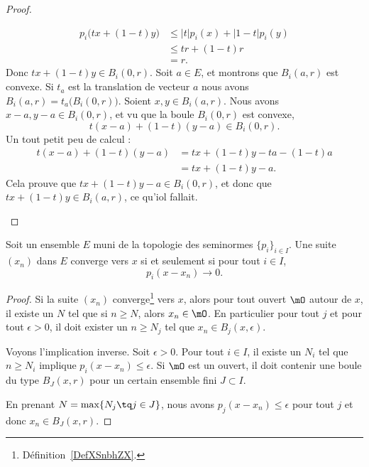 \begin{proof}
\begin{subproof}
\begin{subequations}
\begin{align}
				p_i\big( tx+(1-t)y \big) & \leq | t |p_i(x)+| 1-t |p_i(y) \\
				                         & \leq tr+(1-t)r                 \\
				                         & =r.
			\end{align}
		\end{subequations}
		Donc \( tx+(1-t)y\in B_i(0,r)\).
		Soit \( a\in E\), et montrons que \( B_i(a,r)\) est convexe. Si \( t_a\) est la translation de vecteur \( a\) nous avons \( B_i(a,r)=t_a\big( B_i(0,r) \big)\). Soient \( x,y\in B_i(a,r)\). Nous avons \( x-a,y-a\in B_i(0,r)\), et vu que la boule \( B_i(0,r)\) est convexe,
		\begin{equation}
			t(x-a)+(1-t)(y-a)\in B_i(0,r).
		\end{equation}
		Un tout petit peu de calcul :
		\begin{subequations}
			\begin{align}
				t(x-a)+(1-t)(y-a) & =tx+(1-t)y-ta-(1-t)a \\
				                  & =tx+(1-t)y-a.
			\end{align}
		\end{subequations}
		Cela prouve que \( tx+(1-t)y-a\in B_i(0,r)\), et donc que \( tx+(1-t)y\in B_i(a,r)\), ce qu'iol fallait.
	\end{subproof}
\end{proof}

\begin{proposition} \label{PropQPzGKVk}
	Soit un ensemble \( E\) muni de la topologie des seminormes \( \{ p_i \}_{i\in I}\). Une suite \( (x_n)\) dans \( E\) converge vers \( x\) si et seulement si pour tout \( i\in I\),
	\begin{equation}
		p_i(x-x_n)\to 0.
	\end{equation}
\end{proposition}

\begin{proof}
	Si la suite \( (x_n)\) converge\footnote{Définition~\ref{DefXSnbhZX}.} vers \( x\), alors pour tout ouvert \( \mO\) autour de \( x\), il existe un \( N\) tel que si \( n\geq N\), alors \( x_n\in\mO\). En particulier pour tout \( j\) et pour tout \( \epsilon>0\), il doit exister un \( n\geq N_j\) tel que \( x_n\in B_j(x,\epsilon)\).

	Voyons l'implication inverse. Soit \( \epsilon>0\). Pour tout \( i\in I\), il existe un \( N_i\) tel que \( n\geq N_i\) implique \( p_i(x-x_n)\leq \epsilon\). Si \( \mO\) est un ouvert, il doit contenir une boule du type \( B_J(x,r)\) pour un certain ensemble fini \( J\subset I\).

	En prenant \( N=\max\{ N_j\tq j\in J \}\), nous avons \( p_j(x-x_n)\leq \epsilon\) pour tout \( j\) et donc \( x_n\in B_J(x,r)\).
\end{proof}

